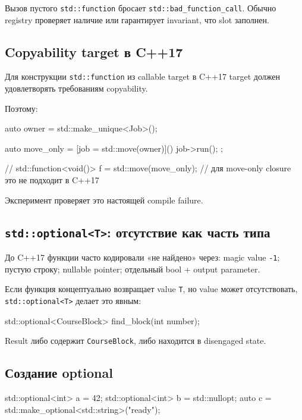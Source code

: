 Вызов пустого \texttt{std::function} бросает
\texttt{std::bad\_function\_call}. Обычно registry проверяет наличие или
гарантирует invariant, что slot заполнен.

\subsection{Copyability target в C++17}

Для конструкции \texttt{std::function} из callable target в C++17 target должен
удовлетворять требованиям copyability.

Поэтому:

\begin{cppcode}
auto owner = std::make_unique<Job>();

auto move_only =
    [job = std::move(owner)]() {
        job->run();
    };

// std::function<void()> f = std::move(move_only);
// для move-only closure это не подходит в C++17
\end{cppcode}

Эксперимент проверяет это настоящей compile failure.

\subsection{\texttt{std::optional<T>}: отсутствие как часть типа}

До C++17 функции часто кодировали «не найдено» через:
magic value \texttt{-1}; пустую строку; nullable pointer; отдельный bool + output parameter.

Если функция концептуально возвращает value \texttt{T}, но value может
отсутствовать, \texttt{std::optional<T>} делает это явным:

\begin{cppcode}
std::optional<CourseBlock> find_block(int number);
\end{cppcode}

Result либо содержит \texttt{CourseBlock}, либо находится в disengaged state.

\subsection{Создание optional}

\begin{cppcode}
std::optional<int> a = 42;
std::optional<int> b = std::nullopt;
auto c = std::make_optional<std::string>("ready");
\end{cppcode}

